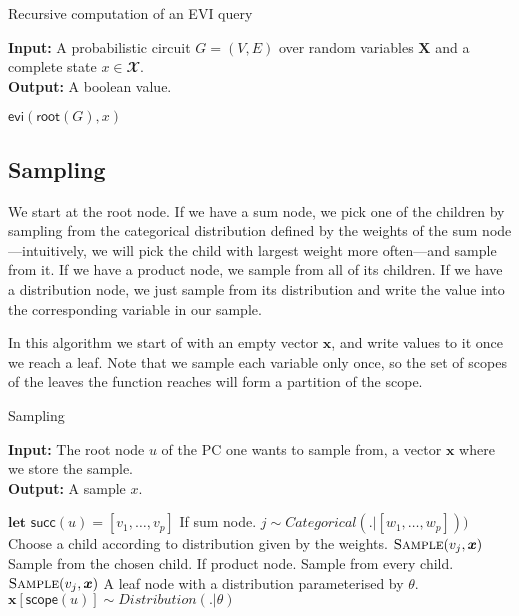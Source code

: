 \documentclass{article}
\newcommand{\func}[1]{\ensuremath{\textsf{#1}}} %
\newcommand{\obj}[1]{\ensuremath{\textit{#1}}} %
\begin{document}
\begin{algorithm}[h]
\caption{Recursive computation of an EVI query}
{\textbf{Input:} A probabilistic circuit $G = (V,E)$ over random variables $\mathbf{X}$ and a complete state $x \in \mathbfcal{X}$.
} \\
{\textbf{Output:} A boolean value. }
\begin{algorithmic}[1]
\State \Return $\func{evi}(\func{root}(G), x)$
\EndFunction
\end{algorithmic}
\end{algorithm}

\clearpage
\subsection{Sampling}
We start at the root node. If we have a sum node, we pick one of the children by sampling from the categorical distribution defined by the weights of the sum node---intuitively, we will pick the child with largest weight more often---and sample from it. If we have a product node, we sample from all of its children. If we have a distribution node, we just sample from its distribution and write the value into the corresponding variable in our sample. 

In this algorithm we start of with an empty vector $\bm{x}$, and write values to it once we reach a leaf. Note that we sample each variable only once, so the set of scopes of the leaves the function reaches will form a partition of the scope.

\begin{algorithm}[h]
\caption{Sampling}
{\textbf{Input:} The root node $u$ of the PC one wants to sample from, a vector $\bm{x}$ where we store the sample.} \\
{\textbf{Output:} A sample $x$. }
\label{alg:learnspn}
\begin{algorithmic}[1]
\State $\textbf{let } \func{succ}(u) = [v_1, \ldots, v_p]$
  \If {$u = \obj{Sum}([w_1, \ldots, w_p])$} \Comment If sum node.
    \State $j \sim Categorical(.|[w_1, \ldots, w_p]))$ \Comment Choose a child according to distribution given by the weights.
    \State $\textsc{Sample}(v_j, \bm{x})$ \Comment Sample from the chosen child.
  \ElsIf {$u = \obj{Product}()$} \Comment If product node.
    \For {$v_j \in \func{succ}(u)$} \Comment Sample from every child.
    \State $\textsc{Sample}(v_j, \bm{x})$
    \EndFor
  \Else \Comment A leaf node with a distribution parameterised by $\theta$.
    \State $\bm{x}[\func{scope}(u)] \sim  Distribution(. | \theta)$
  \EndIf    
\EndFunction
\end{algorithmic}
\end{algorithm}
\end{document}
